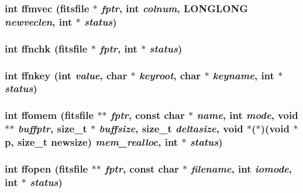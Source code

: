 \subsubsection{\setlength{\rightskip}{0pt plus 5cm}int ffmvec (\bf{fitsfile} $\ast$ {\em fptr}, int {\em colnum}, \bf{LONGLONG} {\em newveclen}, int $\ast$ {\em status})}\label{src_2fitsio_8h_4d65fa6c7cdfb529d91ceeed740985b3}


\subsubsection{\setlength{\rightskip}{0pt plus 5cm}int ffnchk (\bf{fitsfile} $\ast$ {\em fptr}, int $\ast$ {\em status})}\label{src_2fitsio_8h_3045d84f13f392c7d7600c5d734f4db7}


\subsubsection{\setlength{\rightskip}{0pt plus 5cm}int ffnkey (int {\em value}, char $\ast$ {\em keyroot}, char $\ast$ {\em keyname}, int $\ast$ {\em status})}\label{src_2fitsio_8h_246d87f69e3a02a1105b9013ca8f4409}


\subsubsection{\setlength{\rightskip}{0pt plus 5cm}int ffomem (\bf{fitsfile} $\ast$$\ast$ {\em fptr}, const char $\ast$ {\em name}, int {\em mode}, void $\ast$$\ast$ {\em buffptr}, size\_\-t $\ast$ {\em buffsize}, size\_\-t {\em deltasize}, void $\ast$($\ast$)(void $\ast$p, size\_\-t newsize) {\em mem\_\-realloc}, int $\ast$ {\em status})}\label{src_2fitsio_8h_d76715975f2022594bbce821ab9d5d81}


\subsubsection{\setlength{\rightskip}{0pt plus 5cm}int ffopen (\bf{fitsfile} $\ast$$\ast$ {\em fptr}, const char $\ast$ {\em filename}, int {\em iomode}, int $\ast$ {\em status})}\label{src_2fitsio_8h_c42982e168064c85aefcc72de41d1ce9}


